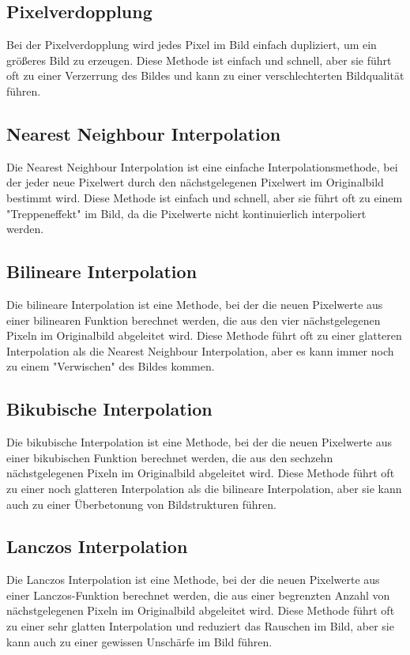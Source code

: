 \subsection{Pixelverdopplung}

Bei der Pixelverdopplung wird jedes Pixel im Bild einfach dupliziert, um ein größeres Bild zu erzeugen. 
Diese Methode ist einfach und schnell, aber sie führt oft zu einer Verzerrung des Bildes und kann zu einer verschlechterten Bildqualität führen.

\subsection{Nearest Neighbour Interpolation}

Die Nearest Neighbour Interpolation ist eine einfache Interpolationsmethode, bei der jeder neue Pixelwert durch den nächstgelegenen Pixelwert im Originalbild bestimmt wird. 
Diese Methode ist einfach und schnell, aber sie führt oft zu einem "Treppeneffekt" im Bild, da die Pixelwerte nicht kontinuierlich interpoliert werden.

\subsection{Bilineare Interpolation}

Die bilineare Interpolation ist eine Methode, bei der die neuen Pixelwerte aus einer bilinearen Funktion berechnet werden, die aus den vier nächstgelegenen Pixeln im Originalbild abgeleitet wird. 
Diese Methode führt oft zu einer glatteren Interpolation als die Nearest Neighbour Interpolation, aber es kann immer noch zu einem "Verwischen" des Bildes kommen.

\subsection{Bikubische Interpolation}

Die bikubische Interpolation ist eine Methode, bei der die neuen Pixelwerte aus einer bikubischen Funktion berechnet werden, die aus den sechzehn nächstgelegenen Pixeln im Originalbild abgeleitet wird.
Diese Methode führt oft zu einer noch glatteren Interpolation als die bilineare Interpolation, aber sie kann auch zu einer Überbetonung von Bildstrukturen führen.

\subsection{Lanczos Interpolation}
Die Lanczos Interpolation ist eine Methode, bei der die neuen Pixelwerte aus einer Lanczos-Funktion berechnet werden, die aus einer begrenzten Anzahl von nächstgelegenen Pixeln im Originalbild abgeleitet wird. 
Diese Methode führt oft zu einer sehr glatten Interpolation und reduziert das Rauschen im Bild, aber sie kann auch zu einer gewissen Unschärfe im Bild führen.

